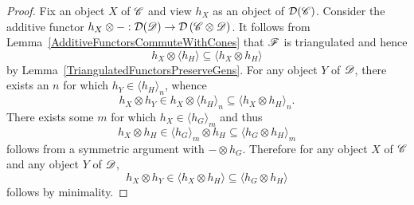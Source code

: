 \documentclass[dissertation.tex]{subfiles}
\begin{document}
\begin{thm}
\begin{proof}
            Fix an object $X$ of $\mathscr{C}$ and view $h_X$ as an object of $\mathcal{D}(\mathscr{C})$.
            Consider the additive functor $h_X \otimes -: \mathcal{D}(\mathscr{D}) \to \mathcal{D}\left(\mathscr{C} \otimes \mathscr{D}\right)$. %
            It follows from Lemma~\ref{AdditiveFunctorsCommuteWithCones} that $\mathscr{F}$ is triangulated and hence 
            $$h_X \otimes \langle h_H \rangle \subseteq \langle h_X \otimes h_H \rangle$$
            by Lemma~\ref{TriangulatedFunctorsPreserveGens}.
            For any object $Y$ of $\mathscr{D}$, there exists an $n$ for which $h_Y \in \langle h_H \rangle_n$, whence
            $$h_X \otimes h_Y \in h_X \otimes \langle h_H\rangle_n \subseteq \langle h_X \otimes h_H\rangle_n.$$
            There exists some $m$ for which $h_X \in \langle h_G \rangle_m$ and thus
            $$h_X \otimes h_H \in \langle h_G \rangle_m \otimes h_H \subseteq \langle h_G \otimes h_H \rangle_m$$
            follows from a symmetric argument with $- \otimes h_G$.
            Therefore for any object $X$ of $\mathscr{C}$ and any object $Y$ of $\mathscr{D}$,
            $$h_X \otimes h_Y \in \langle h_X \otimes h_H \rangle \subseteq \langle h_G \otimes h_H\rangle$$
            follows by minimality.
          \end{proof}
        \end{thm}
\end{document}
